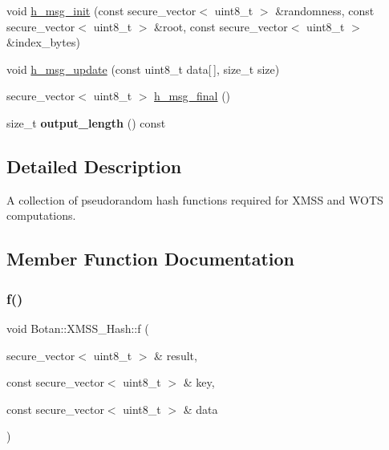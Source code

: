 \begin{DoxyCompactItemize}
\item 
void \hyperlink{class_botan_1_1_x_m_s_s___hash_a8098c0af45ca712b79ef01d904a060b6}{h\+\_\+msg\+\_\+init} (const secure\+\_\+vector$<$ uint8\+\_\+t $>$ \&randomness, const secure\+\_\+vector$<$ uint8\+\_\+t $>$ \&root, const secure\+\_\+vector$<$ uint8\+\_\+t $>$ \&index\+\_\+bytes)
\item 
void \hyperlink{class_botan_1_1_x_m_s_s___hash_a435374ec81321993332a76894fedf220}{h\+\_\+msg\+\_\+update} (const uint8\+\_\+t data\mbox{[}$\,$\mbox{]}, size\+\_\+t size)
\item 
secure\+\_\+vector$<$ uint8\+\_\+t $>$ \hyperlink{class_botan_1_1_x_m_s_s___hash_a1a0f37dd860f879b4a1184505c9876a3}{h\+\_\+msg\+\_\+final} ()
\item 
\mbox{\label{class_botan_1_1_x_m_s_s___hash_a34b50d71409357b29f27f333948bed00}} 
size\+\_\+t {\bfseries output\+\_\+length} () const
\end{DoxyCompactItemize}


\subsection{Detailed Description}
A collection of pseudorandom hash functions required for X\+M\+SS and W\+O\+TS computations. 

\subsection{Member Function Documentation}
\mbox{\label{class_botan_1_1_x_m_s_s___hash_a142126cdbb5969ffdf13daeb6b903dc2}} 
\subsubsection{\texorpdfstring{f()}{f()}}
{\footnotesize\ttfamily void Botan\+::\+X\+M\+S\+S\+\_\+\+Hash\+::f (\begin{DoxyParamCaption}\item[{secure\+\_\+vector$<$ uint8\+\_\+t $>$ \&}]{result,  }\item[{const secure\+\_\+vector$<$ uint8\+\_\+t $>$ \&}]{key,  }\item[{const secure\+\_\+vector$<$ uint8\+\_\+t $>$ \&}]{data }\end{DoxyParamCaption})\hspace{0.3cm}{\ttfamily [inline]}}

